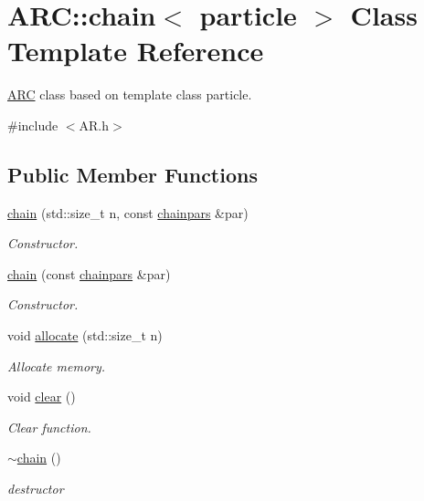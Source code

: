 \hypertarget{classARC_1_1chain}{}\section{A\+RC\+:\+:chain$<$ particle $>$ Class Template Reference}
\label{classARC_1_1chain}


\hyperlink{namespaceARC}{A\+RC} class based on template class particle.  




{\ttfamily \#include $<$A\+R.\+h$>$}

\subsection*{Public Member Functions}
\begin{DoxyCompactItemize}
\item 
\hyperlink{classARC_1_1chain_a38fc886b32c9496571b1649e784583a3}{chain} (std\+::size\+\_\+t n, const \hyperlink{classARC_1_1chainpars}{chainpars} \&par)
\begin{DoxyCompactList}\small\item\em Constructor. \end{DoxyCompactList}\item 
\hyperlink{classARC_1_1chain_ab4777422b1d084dabdfa1d561ad5ba02}{chain} (const \hyperlink{classARC_1_1chainpars}{chainpars} \&par)
\begin{DoxyCompactList}\small\item\em Constructor. \end{DoxyCompactList}\item 
void \hyperlink{classARC_1_1chain_ac0bbd32e714913e1e8eb36eb2e8c3fd4}{allocate} (std\+::size\+\_\+t n)
\begin{DoxyCompactList}\small\item\em Allocate memory. \end{DoxyCompactList}\item 
void \hyperlink{classARC_1_1chain_a5299fa50788dc7e5d15504c33f76333f}{clear} ()
\begin{DoxyCompactList}\small\item\em Clear function. \end{DoxyCompactList}\item 
\hyperlink{classARC_1_1chain_a3467a68afb2daebec6c57899897a461c}{$\sim$chain} ()
\begin{DoxyCompactList}\small\item\em destructor \end{DoxyCompactList}\item 

\end{DoxyCompactItemize}
